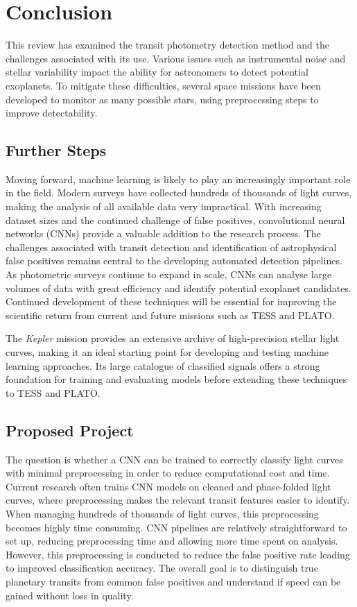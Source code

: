 \section{Conclusion} \label{sec:Further_Steps}

This review has examined the transit photometry detection method and the challenges associated with its use. Various issues such as instrumental noise and stellar variability impact the ability for astronomers to detect potential exoplanets. To mitigate these difficulties, several space missions have been developed to monitor as many possible stars, using preprocessing steps to improve detectability.

\subsection{Further Steps}

Moving forward, machine learning is likely to play an increasingly important role in the field. Modern surveys have collected hundreds of thousands of light curves, making the analysis of all available data very impractical. With increasing dataset sizes and the continued challenge of false positives, convolutional neural networks (CNNs) provide a valuable addition to the research process. The challenges associated with transit detection and identification of astrophysical false positives remains central to the developing automated detection pipelines. As photometric surveys continue to expand in scale, CNNs can analyse large volumes of data with great efficiency and identify potential exoplanet candidates. Continued development of these techniques will be essential for improving the scientific return from current and future missions such as TESS and PLATO.

The \textit{Kepler} mission provides an extensive archive of high-precision stellar light curves, making it an ideal starting point for developing and testing machine learning approaches. Its large catalogue of classified signals offers a strong foundation for training and evaluating models before extending these techniques to TESS and PLATO.

\subsection{Proposed Project}

The question is whether a CNN can be trained to correctly classify light curves with minimal preprocessing in order to reduce computational cost and time. Current research often trains CNN models on cleaned and phase-folded light curves, where preprocessing makes the relevant transit features easier to identify. When managing hundreds of thousands of light curves, this preprocessing becomes highly time consuming. CNN pipelines are relatively straightforward to set up, reducing preprocessing time and allowing more time spent on analysis. However, this preprocessing is conducted to reduce the false positive rate leading to improved classification accuracy. The overall goal is to distinguish true planetary transits from common false positives and understand if speed can be gained without loss in quality.  

